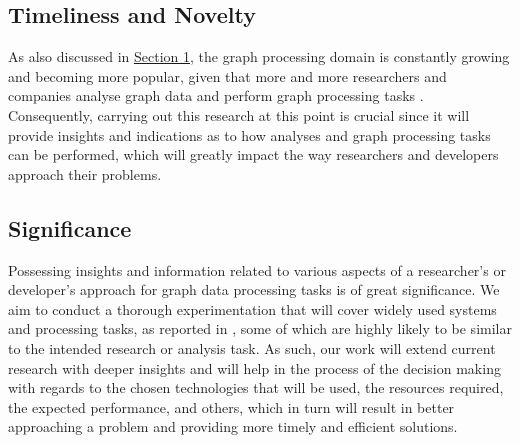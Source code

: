 \documentclass[a4paper,11pt]{article}
\begin{document}

\subsection{Timeliness and Novelty}

\par As also discussed in \hyperref[introduction]{Section 1}, the graph processing domain is constantly growing and becoming more popular, given that more and more researchers and companies analyse graph data and perform graph processing tasks \cite{facebook-trillion, twitter-sentiment}. Consequently, carrying out this research at this point is crucial since it will provide insights and indications as to how analyses and graph processing tasks can be performed, which will greatly impact the way researchers and developers approach their problems.


\subsection{Significance}



\par Possessing insights and information related to various aspects of a researcher's or developer's approach for graph data processing tasks is of great significance. We aim to conduct a thorough experimentation that will cover widely used systems and processing tasks, as reported in \cite{survey}, some of which are highly likely to be similar to the intended research or analysis task. As such, our work will extend current research with deeper insights and will help in the process of the decision making with regards to the chosen technologies that will be used, the resources required, the expected performance, and others, which in turn will result in better approaching a problem and providing more timely and efficient solutions.


\end{document}
